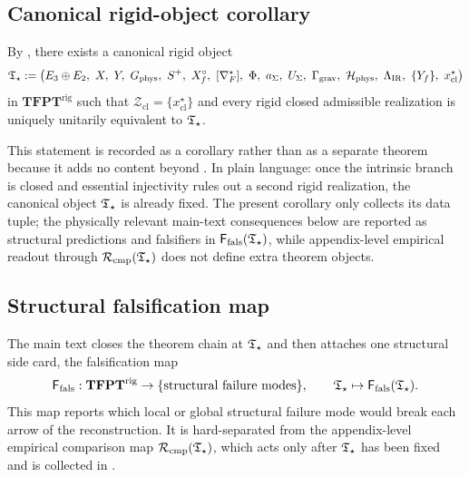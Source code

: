 \subsection{Canonical rigid-object corollary}

\begin{corollary}
\label{cor:canonical-rigid-object}
By ,
there exists a canonical rigid object
\[
\Tstar
:=
\bigl(
E_3\oplus E_2,\ X,\ Y,\ G_{\mathrm{phys}},\ S^+,\ X_f^\circ,\ [\nabla_F^\star],\ \Phi,\ a_\Sigma,\ U_\Sigma,\ \Gamma_{\mathrm{grav}},\ \mathcal H_{\mathrm{phys}},\ \Lambda_{\mathrm{IR}},\ \{Y_f\},\ x_{\mathrm{cl}}^\star
\bigr)
\]
in $\mathbf{TFPT}^{\mathrm{rig}}$ such that $\mathcal Z_{\mathrm{cl}}=\{x_{\mathrm{cl}}^\star\}$
and every rigid closed admissible realization is uniquely unitarily equivalent to $\mathfrak T_{\star}$.
\end{corollary}

\begin{remark}
This statement is recorded as a corollary rather than as a separate theorem because it adds no
content beyond .
In plain language: once the intrinsic branch is closed and essential injectivity rules out a
second rigid realization, the canonical object $\mathfrak T_{\star}$ is already fixed. The present corollary
only collects its data tuple; the physically relevant main-text consequences below are reported as
structural predictions and falsifiers in $\mathsf F_{\mathrm{fals}}(\mathfrak T_{\star})$, while appendix-level empirical readout
through $\mathcal R_{\mathrm{cmp}}(\mathfrak T_{\star})$ does not define extra theorem objects.
\end{remark}

\subsection{Structural falsification map}
\label{sec:structural-falsification-map}

The main text closes the theorem chain at $\mathfrak T_{\star}$ and then attaches one structural side card,
the falsification map
\[
\mathsf F_{\mathrm{fals}}:\mathbf{TFPT}^{\mathrm{rig}}\to\{\text{structural failure modes}\},
\qquad
\mathfrak T_{\star}\mapsto \mathsf F_{\mathrm{fals}}(\mathfrak T_{\star}).
\]
This map reports which local or global structural failure mode would break each arrow of the
reconstruction. It is hard-separated from the appendix-level empirical comparison map
$\mathcal R_{\mathrm{cmp}}(\mathfrak T_{\star})$, which acts only after $\mathfrak T_{\star}$ has been fixed and is collected in
.


